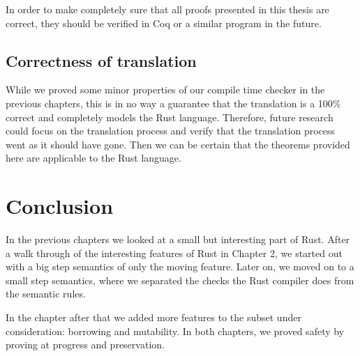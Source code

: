In order to make completely sure that all proofs presented in this thesis are correct, they should be verified in Coq or a similar program in the future. 

\subsection{Correctness of translation}
While we proved some minor properties of our compile time checker in the previous chapters, this is in no way a guarantee that the translation is a 100\% correct and completely models the Rust language. Therefore, future research could focus on the translation process and verify that the translation process went as it should have gone. Then we can be certain that the theorems provided here are applicable to the Rust language. 

\section{Conclusion}
In the previous chapters we looked at a small but interesting part of Rust. After a walk through of the interesting features of Rust in Chapter 2, we started out with a big step semantics of only the moving feature. Later on, we moved on to a small step semantics, where we separated the checks the Rust compiler does from the semantic rules. 

In the chapter after that we added more features to the subset under consideration: borrowing and mutability. In both chapters, we proved safety by proving at progress and preservation. 
